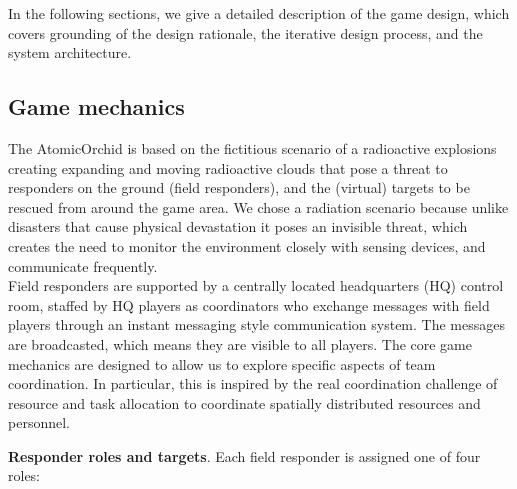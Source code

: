 In the following sections, we give a detailed description of the game design, which covers  grounding of the design rationale, the iterative design process, and the system architecture.

\subsection{Game mechanics} \label{sec:gameRatinale}
The AtomicOrchid is based on the fictitious scenario of a radioactive explosions creating expanding and moving radioactive clouds that pose a threat to responders on the ground (field responders), and the (virtual) targets to be rescued from around the game area. We chose a radiation scenario because unlike disasters that cause physical devastation it poses an invisible threat, which creates the need to monitor the environment closely with sensing devices, and communicate frequently.\\

Field responders are supported by a centrally located headquarters (HQ) control room, staffed by HQ players as coordinators who exchange messages with field players through an instant messaging style communication system. The messages are broadcasted, which means they are visible to all players. The core game mechanics are designed to allow us to explore specific aspects of team coordination. In particular, this is inspired by the real coordination challenge of resource and task allocation to coordinate spatially distributed resources and personnel. 



\textbf{Responder roles and targets}. Each field responder is assigned one of four roles:\\


